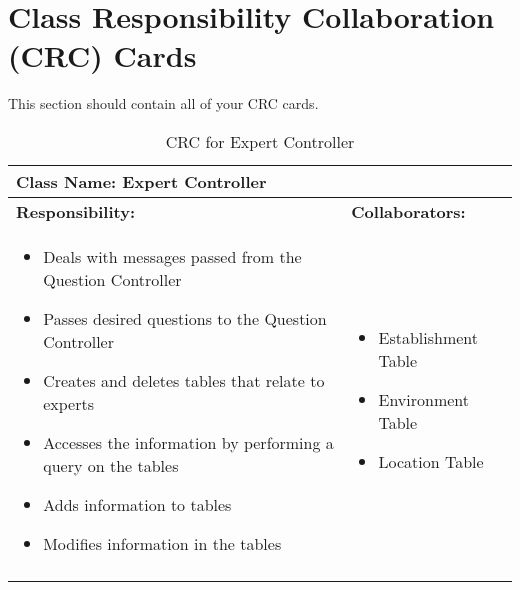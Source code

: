\documentclass[titlepage]{article}
\begin{document}
	
\newpage	
\section{Class Responsibility Collaboration (CRC) Cards}
\label{sec:class_responsibility_collaboration_crc_cards}
This section should contain all of your CRC cards.
	
	\begin{longtable}{| p{} | p{} |}
			\hline
			 \multicolumn{2}{|l|}{\textbf{Class Name: Expert Controller}} \\
			\hline
			\textbf{Responsibility:} & \textbf{Collaborators:} \\
			\hline
				\begin{itemize}
					\item Deals with messages passed from the Question Controller
					\item Passes desired questions to the Question Controller
					\item Creates and deletes tables that relate to experts
					\item Accesses the information by performing a query on the tables
					\item Adds information to tables
					\item Modifies information in the tables
				\end{itemize} & 
				\begin{itemize}
					\item Establishment Table
					\item Environment Table
					\item Location Table
				\end{itemize} 
				\\
			\hline
		\caption{CRC for Expert Controller}
	\end{longtable}
	
\end{document}
